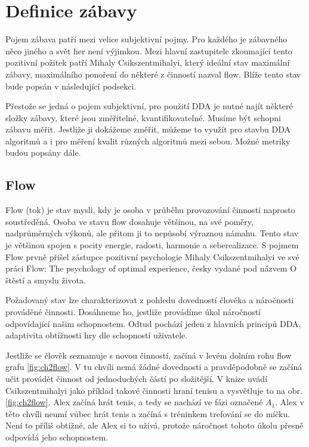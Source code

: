 \chapter{Definice zábavy}

Pojem zábava patří mezi velice subjektivní pojmy. Pro každého je zábavného něco jiného a svět her není výjimkou. Mezi hlavní zastupitele zkoumající tento pozitivní požitek patří Mihaly Csikszentmihalyi, který ideální stav maximální zábavy, maximálního ponoření do některé z činností nazval flow. Blíže tento stav bude popsán v následující podsekci.

Přestože se jedná o pojem subjektivní, pro použití DDA je nutné najít některé složky zábavy, které jsou změřitelné, kvantifikovatelné. Musíme být schopni zábavu měřit. Jestliže ji dokážeme změřit, můžeme to využít pro stavbu DDA algoritmů a i pro měření kvalit různých algoritmů mezi sebou. Možné metriky budou popsány dále.

\section{Flow}

Flow (tok) je stav mysli, kdy je osoba v průběhu provozování činnosti naprosto soustředěná. Osoba ve stavu flow dosahuje většinou, na své poměry, nadprůměrných výkonů, ale přitom ji to nepůsobí výraznou námahu. Tento stav je většinou spojen s pocity energie, radosti, harmonie a seberealizace.\cite{FlowCZ} S pojmem Flow prvně přišel zástupce pozitivní psychologie Mihaly Csikszentmihalyi ve své práci Flow: The psychology of optimal experience, česky vydané pod názvem O štěstí a smyslu života.

Požadovaný stav lze charakterizovat z pohledu dovedností člověka a náročnosti prováděné činnosti. Dosáhneme ho, jestliže provádíme úkol náročností odpovídající našim schopnostem. Odtud pochází jeden z hlavních principů DDA, adaptivita obtížnosti hry dle schopností uživatele.

Jestliže se člověk seznamuje s novou činností, začíná v levém dolním rohu flow grafu \ref{fig:ch2flow}. V tu chvíli nemá žádné dovednosti a pravděpodobně se začíná učit provádět činnost od jednoduchých částí po složitější. V knize \cite{OptimalFun} uvádí Csikszentmihalyi jako příklad takové činnosti hraní tenisu a vysvětluje to na obr. \ref{fig:ch2flow}. Alex začíná hrát tenis, a tedy se nachází ve fázi označené $A_1$. Alex v této chvíli neumí vůbec hrát tenis a začíná s tréninkem trefování se do míčku. Není to příliš obtížné, ale Alex si to užívá, protože náročnost tohoto úkolu přesně odpovídá jeho schopnostem.

